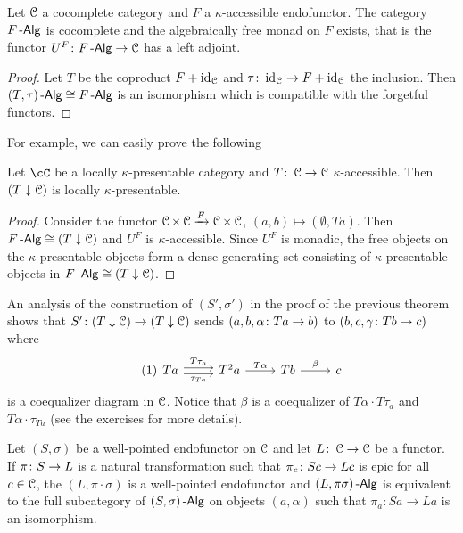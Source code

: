 \documentclass[a4paper,11pt,oneside,openany]{scrbook}
\begin{document}
\begin{thm}
	Let $ \operatorname{\mathcal{C}} $ a cocomplete category and $ F $ a $ \kappa $-accessible endofunctor.
	The category $ F\operatorname{-\mathsf{Alg}} $ is cocomplete and the algebraically free monad on $ F $ exists, that is the functor
	$ U^F \colon F\operatorname{-\mathsf{Alg}} \to \operatorname{\mathcal{C}} $ has a left adjoint.
\end{thm}
\begin{proof}
	Let $ T $ be the coproduct $ F + \operatorname{id}_{\operatorname{\mathcal{C}}} $ and $ \tau\colon \operatorname{id}_{\operatorname{\mathcal{C}}} \to F+\operatorname{id}_{\operatorname{\mathcal{C}}} $ the inclusion.
	Then $  (T,\tau)\operatorname{-\mathsf{Alg}} \cong F\operatorname{-\mathsf{Alg}} $ is an isomorphism which is compatible with the forgetful functors.
\end{proof}
For example, we can easily prove the following
\begin{prop}
	Let $ \cC $ be a locally $ \kappa $-presentable category and $ T \colon \operatorname{\mathcal{C}}
		\to \operatorname{\mathcal{C}} $ $ \kappa $-accessible. Then $ (T\downarrow\operatorname{\mathcal{C}}) $ is locally $ \kappa
	$-presentable.
\end{prop}
\begin{proof}
	Consider the functor $ \operatorname{\mathcal{C}} \times \operatorname{\mathcal{C}} \xrightarrow{F} \operatorname{\mathcal{C}} \times \operatorname{\mathcal{C}} $, $ (a,b)\mapsto (\emptyset, Ta) $.
	Then $ F\operatorname{-\mathsf{Alg}} \cong (T\downarrow\operatorname{\mathcal{C}}) $ and $ U^F $ is $ \kappa $-accessible.
	Since $ U^F  $ is monadic, the free objects on the $ \kappa $-presentable objects form a dense generating set consisting of $ \kappa $-presentable objects in $ F\operatorname{-\mathsf{Alg}} \cong (T\downarrow\operatorname{\mathcal{C}}) $.
\end{proof}
\begin{rmk}
	An analysis of the construction of $ (S',\sigma') $ in the proof of the previous theorem shows that $ S' \colon (T\downarrow\operatorname{\mathcal{C}}) \to (T\downarrow\operatorname{\mathcal{C}}) $ sends $ (a,b,\alpha \colon Ta \to b) $ to $ (b,c, \gamma \colon Tb \to c) $ where
	\begin{displaymath}\tag{1}\label{fork1}
		\begin{tikzcd}
			T a \arrow[r,shift left, "T \tau_a"]\arrow[r,shift right, "\tau_{Ta}"']& T^2 a \arrow[r, "T\alpha" ] & Tb \arrow[r, "\beta"]  & c
		\end{tikzcd}
	\end{displaymath}
	is a coequalizer diagram in $ \operatorname{\mathcal{C}} $.
	Notice that $ \beta $ is a coequalizer of $ T\alpha \cdot T\tau_a $ and $
		T\alpha \cdot \tau_{Ta} $ (see the exercises for more details).
\end{rmk}
\begin{prop}
	Let $ (S,\sigma) $ be a well-pointed endofunctor on $ \operatorname{\mathcal{C}} $ and let $ L\colon \operatorname{\mathcal{C}} \to \operatorname{\mathcal{C}} $ be a functor.
	If $ \pi \colon S \to L $ is a natural transformation such that $ \pi_c \colon
		Sc \to Lc $ is epic for all $ c\in\operatorname{\mathcal{C}} $, the $ (L,\pi\cdot \sigma) $ is a well-pointed endofunctor and $ (L,\pi\sigma)\operatorname{-\mathsf{Alg}} $ is equivalent to the full subcategory of $ (S,\sigma)\operatorname{-\mathsf{Alg}} $ on objects $ (a,\alpha) $ such that $ \pi_a\colon Sa \to La $ is an isomorphism.
\end{prop}
\end{document}
